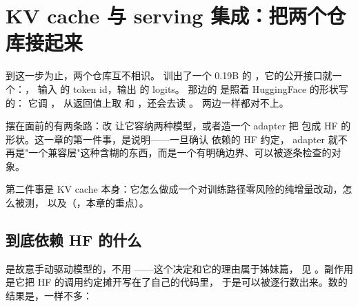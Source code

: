 
\section{KV cache 与 serving 集成：把两个仓库接起来}
\label{sec:b-kv}

到这一步为止，两个仓库互不相识。 训出了一个 0.19B 的
，它的公开接口就一个：，
输入  的 token id，输出  的 logits。
 那边的  是照着 HuggingFace 的形状写的：
它调 ，
从返回值上取  和 ，还会去读 。
两边一样都对不上。

摆在面前的有两条路：改  让它容纳两种模型，或者造一个 adapter 把
 包成 HF 的形状。这一章的第一件事，是说明——一旦确认  依赖的 HF 约定，
adapter 就不再是"一个兼容层"这种含糊的东西，而是一个有明确边界、可以被逐条检查的对象。

第二件事是 KV cache 本身：它怎么做成一个对训练路径零风险的纯增量改动，怎么被测，
以及（，本章的重点）。

\subsection{ 到底依赖 HF 的什么}
\label{sec:b-kv-four}

 是故意手动驱动模型的，不用 ——这个决定和它的理由属于姊妹篇，
见 。副作用是它把 HF 的调用约定摊开写在了自己的代码里，
于是可以被逐行数出来。数的结果是，一样不多：

